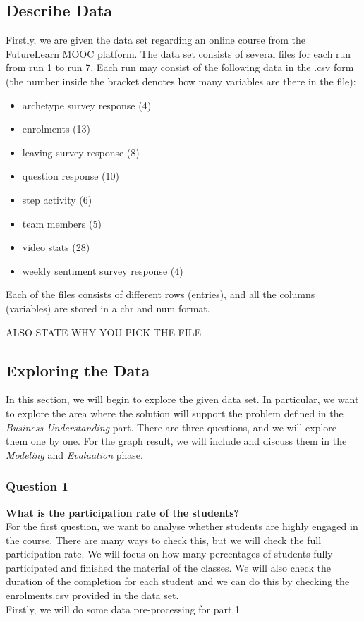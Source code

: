 \documentclass[12pt,]{article}
\providecommand{\tightlist}{%
\setlength{\itemsep}{0pt}\setlength{\parskip}{0pt}}
\begin{document}
\hypertarget{describe-data}{%
\subsection{Describe Data}\label{describe-data}}

Firstly, we are given the data set regarding an online course from the
FutureLearn MOOC platform. The data set consists of several files for
each run from run 1 to run 7. Each run may consist of the following data
in the .csv form (the number inside the bracket denotes how many
variables are there in the file):

\begin{itemize}
\tightlist
\item
  archetype survey response (4)
\item
  enrolments (13)
\item
  leaving survey response (8)
\item
  question response (10)
\item
  step activity (6)
\item
  team members (5)
\item
  video stats (28)
\item
  weekly sentiment survey response (4)
\end{itemize}

\noindent Each of the files consists of different rows (entries), and
all the columns (variables) are stored in a chr and num format.

ALSO STATE WHY YOU PICK THE FILE

\hypertarget{exploring-the-data}{%
\subsection{Exploring the Data}\label{exploring-the-data}}

In this section, we will begin to explore the given data set. In
particular, we want to explore the area where the solution will support
the problem defined in the \emph{Business Understanding} part. There are
three questions, and we will explore them one by one. For the graph
result, we will include and discuss them in the \emph{Modeling} and
\emph{Evaluation} phase.

\hypertarget{question-1}{%
\subsubsection{Question 1}\label{question-1}}

\textbf{What is the participation rate of the students?}\\
\hfill\break For the first question, we want to analyse whether students
are highly engaged in the course. There are many ways to check this, but
we will check the full participation rate. We will focus on how many
percentages of students fully participated and finished the material of
the classes. We will also check the duration of the completion for each
student and we can do this by checking the enrolments.csv provided in
the data set.\\
\hfill\break Firstly, we will do some data pre-processing for part 1
\end{document}
